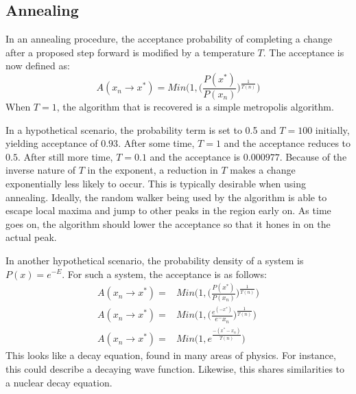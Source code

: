 \documentclass[twocolumn]{article}
\begin{document}
\subsection{Annealing}
In an annealing procedure, the acceptance probability of completing a change after a proposed step forward is modified by a temperature $T$. The acceptance is now defined as:
\begin{equation}
A(x_n \to x^*) = Min \Bigg( 1, \Big( \frac{P(x^*)}{P(x_n)}\Big) ^{ \frac{1}{T(n)} } \Bigg)
\end{equation}
When $T=1$, the algorithm that is recovered is a simple metropolis algorithm. 

In a hypothetical scenario, the probability term is set to 0.5 and $T=100$ initially, yielding acceptance of $0.93$. After some time, $T=1$ and the acceptance reduces to $0.5$. After still more time, $T=0.1$ and the acceptance is $0.000977$. Because of the inverse nature of $T$ in the exponent, a reduction in $T$ makes a change exponentially less likely to occur. This is typically desirable when using annealing. Ideally, the random walker being used by the algorithm is able to escape local maxima and jump to other peaks in the region early on. As time goes on, the algorithm should lower the acceptance so that it hones in on the actual peak.

In another hypothetical scenario, the probability density of a system is $P(x) = e^{-E}$. For such a system, the acceptance is as follows:
\begin{equation}
\begin{split}
A(x_n \to x^*) =& Min \Bigg( 1, \Big( \frac{P(x^*)}{P(x_n)}\Big) ^{ \frac{1}{T(n)} } \Bigg) \\
A(x_n \to x^*) =& Min \Bigg( 1, \Big( \frac{e^(-x^*)}{e^-x_n}\Big) ^{ \frac{1}{T(n)} } \Bigg) \\ 
A(x_n \to x^*) =& Min \Bigg( 1, e^{\frac{-(x^* - x_n)}{T(n)}} \Bigg)
\end{split}
\end{equation}
This looks like a decay equation, found in many areas of physics. For instance, this could describe a decaying wave function. Likewise, this shares similarities to a nuclear decay equation.
\end{document}
